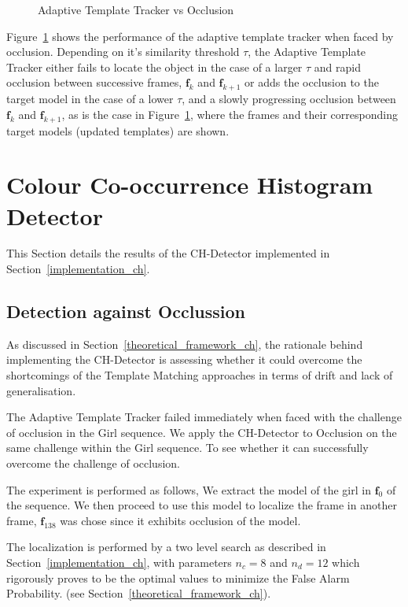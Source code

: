 \begin{figure}
{\begin{tabular}{cccc}
        \end{tabular}}
    \caption{Adaptive Template Tracker vs Occlusion\label{fig:adaptive_template_occlusion}}
\end{figure}

Figure~\ref{fig:adaptive_template_occlusion} shows the performance of the
adaptive template tracker when faced by occlusion. Depending on it's similarity
threshold $\tau$, the Adaptive Template Tracker either fails to locate the
object in the case of a larger $\tau$ and rapid occlusion between successive
frames, $\mathbf{f}_k$ and $\mathbf{f}_{k+1}$ or adds the occlusion to the
target model in the case of a lower $\tau$, and a slowly progressing occlusion
between $\mathbf{f}_k$ and $\mathbf{f}_{k+1}$, as is the case in
Figure~\ref{fig:adaptive_template_occlusion}, where the frames and their
corresponding target models (updated templates) are shown. 


\section{Colour Co-occurrence Histogram Detector}
This Section details the results of the CH-Detector implemented in
Section~\ref{implementation_ch}.

\subsection{Detection against Occlussion}
As discussed in Section~\ref{theoretical_framework_ch}, the rationale behind
implementing the CH-Detector is assessing whether it could overcome the
shortcomings of the Template Matching approaches in terms of drift and lack of
generalisation.

The Adaptive Template Tracker failed immediately when faced with the challenge
of occlusion in the Girl sequence. We apply the CH-Detector to Occlusion on the
same challenge within the Girl sequence. To see whether it can successfully overcome the
challenge of occlusion.

The experiment is performed as follows, We extract the model of the girl in
$\mathbf{f}_0$ of the sequence. We then proceed to use this model to localize
the frame in another frame, $\mathbf{f}_{138}$ was chose since it exhibits
occlusion of the model. 

The localization is performed by a two level search as described in
Section~\ref{implementation_ch}, with parameters $n_c=8$ and $n_d=12$ which
\cite{Change} rigorously proves to be the optimal values to minimize the False
Alarm Probability. (see Section~\ref{theoretical_framework_ch}).

